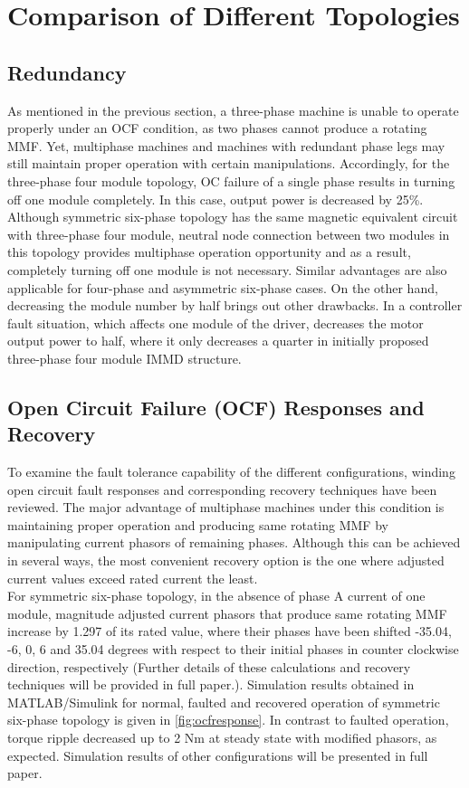 \documentclass[a4paper,11pt]{article}
\begin{document}
\section{\normalsize\textbf{Comparison of Different Topologies}}
\subsection{\normalsize\textbf{Redundancy}}
As mentioned in the previous section, a three-phase machine is unable to operate properly under an OCF condition, as two phases cannot produce a rotating MMF. Yet, multiphase machines and machines with redundant phase legs may still maintain proper operation with certain manipulations. Accordingly, for the three-phase four module topology, OC failure of a single phase results in turning off one module completely. In this case, output power is decreased by 25\%. Although symmetric six-phase topology has the same magnetic equivalent circuit with three-phase four module, neutral node connection between two modules in this topology provides multiphase operation opportunity and as a result, completely turning off one module is not necessary. Similar advantages are also applicable for four-phase and asymmetric six-phase cases. On the other hand, decreasing the module number by half brings out other drawbacks. In a controller fault situation, which affects one module of the driver, decreases the motor output power to half, where it only decreases a quarter in initially proposed three-phase four module IMMD structure.

\subsection{\normalsize\textbf{Open Circuit Failure (OCF) Responses and Recovery}}

To examine the fault tolerance capability of the different configurations, winding open circuit fault responses and corresponding recovery techniques have been reviewed. The major advantage of multiphase machines under this condition is maintaining proper operation and producing same rotating MMF by manipulating current phasors of remaining phases. Although this can be achieved in several ways, the most convenient recovery option is the one where adjusted current values exceed rated current the least.\\

For symmetric six-phase topology, in the absence of phase A current of one module, magnitude adjusted current phasors that produce same rotating MMF increase by 1.297 of its rated value, where their phases have been shifted -35.04, -6, 0, 6 and 35.04 degrees with respect to their initial phases in counter clockwise direction, respectively \cite{recover} (Further details of these calculations and recovery techniques will be provided in full paper.). Simulation results obtained in MATLAB/Simulink for normal, faulted and recovered operation of symmetric six-phase topology is given in \ref{fig:ocfresponse}. In contrast to faulted operation, torque ripple decreased up to 2 Nm at steady state with modified phasors, as expected. Simulation results of other configurations will be presented in full paper.
\end{document}
